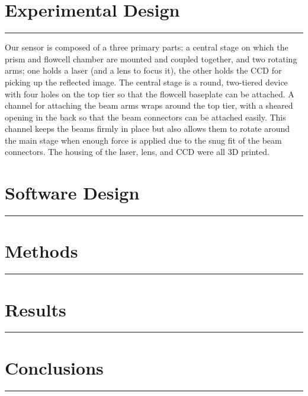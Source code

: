 \documentclass{report}
\begin{document}
	\section*{Experimental Design}
	\vspace{-0.1cm}\hrule\vspace{0.2cm}
	\par{Our sensor is composed of a three primary parts: a central stage on which the prism and flowcell chamber are mounted and coupled together, and two rotating arms; one holds a laser (and a lens to focus it), the other holds the CCD for picking up the reflected image. The central stage is a round, two-tiered device with four holes on the top tier so that the flowcell baseplate can be attached. A channel for attaching the beam arms wraps around the top tier, with a sheared opening in the back so that the beam connectors can be attached easily. This channel keeps the beams firmly in place but also allows them to rotate around the main stage when enough force is applied due to the snug fit of the beam connectors. The housing of the laser, lens, and CCD were all 3D printed.}
	\section*{Software Design}
	\vspace{-0.1cm}\hrule\vspace{0.2cm}
	\section*{Methods}
	\vspace{-0.1cm}\hrule\vspace{0.2cm}
	\section*{Results}
	\vspace{-0.1cm}\hrule\vspace{0.2cm}
	\section*{Conclusions}
	\vspace{-0.1cm}\hrule\vspace{0.2cm}
\end{document}
